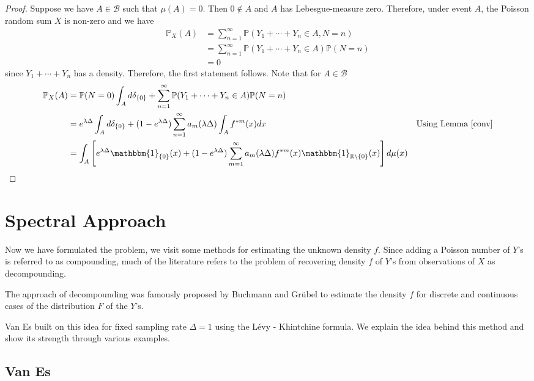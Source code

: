 \documentclass[a4paper,11pt]{article}
\theoremstyle{theorem}
\theoremstyle{definition}
\theoremstyle{remark}
\begin{document}
\begin{proof}
Suppose we have $A \in \mathcal{B}$ such that $\mu(A) = 0$. Then $0 \notin A$ and $A$ has Lebesgue-measure zero. Therefore, under event $A$, the Poisson random sum $X$ is non-zero and we have 
\begin{align*}
\mathbb{P}_{X}(A) &= \sum_{n=1}^{\infty}{\mathbb{P}(Y_1 + \dotsb + Y_n  \in A, N = n)} \\
&= \sum_{n=1}^{\infty}{\mathbb{P}(Y_1 + \dotsb + Y_n  \in A)\mathbb{P}(N = n)} \\
&= 0
\end{align*}
since $Y_1 + \dotsb + Y_n$ has a density. Therefore, the first statement follows. Note that for $A \in \mathcal{B}$
\begin{align*}
\mathbb{P}_{X}(A) &= \mathbb{P}(N = 0)\int_{A}{d\delta_{\{0\}}} + \sum_{n=1}^{\infty}{\mathbb{P}(Y_1 + \dotsb + Y_n  \in A)\mathbb{P}(N = n)} \\
&= e^{\lambda \Delta}\int_{A}{d\delta_{\{0\}}} + (1 - e^{\lambda \Delta})\sum_{n=1}^{\infty}{a_m(\lambda \Delta)\int_{A}{f^{\ast m}(x)dx}} & \text{Using Lemma \ref{conv}} \\
&= \int_{A}\left[{e^{\lambda \Delta} \mathbbm{1}_{\{0\}}(x) + (1 - e^{\lambda \Delta})\sum_{m=1}^{\infty}{a_m(\lambda \Delta) f^{\ast m}(x)\mathbbm{1}_{\mathbb{R}\setminus \{0\}}(x)}}\right]d\mu(x)
\end{align*}
\end{proof}

\section{Spectral Approach}

Now we have formulated the problem, we visit some methods for estimating the unknown density $f$. Since adding a Poisson number of $Y$'s is referred to as compounding, much of the literature refers to the problem of recovering density $f$ of $Y$'s from observations of $X$ as decompounding.

The approach of decompounding was famously proposed by Buchmann and Gr\"{u}bel to estimate the density $f$ for discrete and continuous cases of the distribution $F$ of the $Y$'s.

Van Es built on this idea for fixed sampling rate $\Delta = 1$ using the L\'{e}vy - Khintchine formula. We explain the idea behind this method and show its strength through various examples.

\subsection{Van Es}
\end{document}
